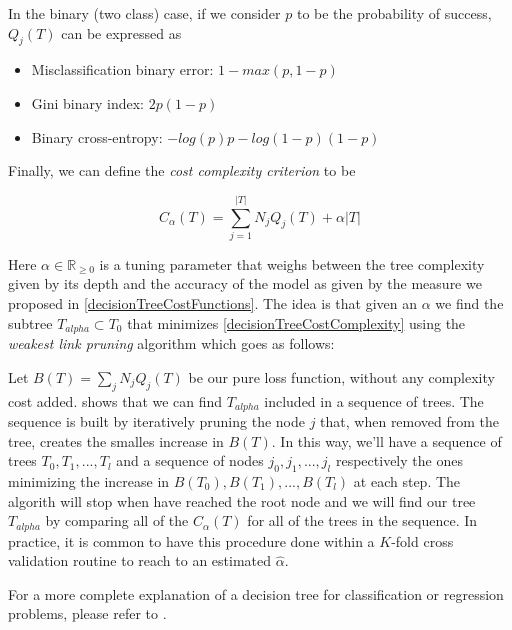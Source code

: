 In the binary (two class) case, if we consider $p$ to be the probability of success, $Q_j(T)$ can be expressed as

\begin{itemize}
	\item Misclassification binary error: $1 - max(p, 1-p)$
	\item Gini binary index: $ 2p(1-p) $
	\item Binary cross-entropy: $ -log(p)p - log(1- p)(1-p) $
\end{itemize}\label{decisionTreeCostFunctions}

Finally, we can define the \textit{cost complexity criterion} to be 

\begin{equation}
C_\alpha(T)  = \sum_{j=1}^{|T|} N_j Q_j(T)  + \alpha|T| 
\end{equation}\label{decisionTreeCostComplexity}

Here  $\alpha \in \mathbb{R}_{\geq 0}$ is a tuning parameter that weighs between the tree complexity given by its depth and the accuracy of the model as given by the measure we proposed in \ref{decisionTreeCostFunctions}. The idea is that given an $\alpha$ we find the subtree $T_{alpha} \subset T_0$ that minimizes \ref{decisionTreeCostComplexity} using the \textit{weakest link pruning} algorithm which goes as follows:

Let  $B(T)  = \sum_{j} N_j Q_j(T) $ be our pure loss function, without any complexity cost added. \cite{breiman-cart84} shows that we can find $T_{alpha}$ included in a sequence of trees. The sequence is built by iteratively pruning the node $j$ that, when removed from the tree, creates the smalles increase in $B(T)$. In this way, we'll have a sequence of trees $T_0,T_1,...,T_l$ and a sequence of nodes $j_0, j_1,...,j_l$ respectively the ones minimizing the increase in $B(T_0),B(T_1),...,B(T_l)$ at each step. The algorith will stop when have reached the root node and we will find our tree $T_{alpha}$ by comparing all of the $C_\alpha(T)$ for all of the trees in the sequence. In practice, it is common to have this procedure done within a $K$-fold cross validation routine to reach to an estimated $\hat{\alpha}$.


For a more complete explanation of a decision tree for classification or regression problems, please refer to \cite{breiman-cart84}.


\textit{}

\textit{}

\textit{}

